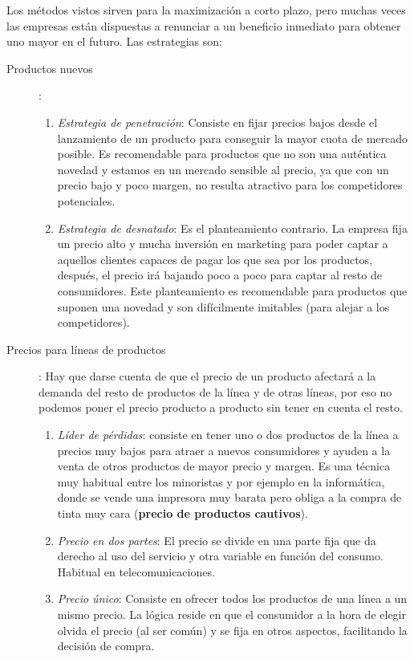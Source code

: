 \documentclass[10pt,a4paper,spanish]{report}
\begin{document}
			Los métodos vistos sirven para la maximización a corto plazo, pero muchas veces las empresas están dispuestas a renunciar a un beneficio inmediato para obtener uno mayor en el futuro. Las estrategias son:
			\begin{description}
				\item[Productos nuevos]: 
				\begin{enumerate}
					\item \textit{\textcolor[rgb]{0.1,0.2,0.4}{Estrategia de penetración}}: Consiste en fijar precios bajos desde el lanzamiento de un producto para conseguir la mayor cuota de mercado posible. Es recomendable para productos que no son una auténtica novedad y estamos en un mercado sensible al precio, ya que con un precio bajo y poco margen, no resulta atractivo para los competidores potenciales.
					\item \textit{\textcolor[rgb]{0.1,0.2,0.4}{Estrategia de desnatado}}: Es el planteamiento contrario. La empresa fija un precio alto y mucha inversión en marketing para poder captar a aquellos clientes capaces de pagar los que sea por los productos, después, el precio irá bajando poco a poco para captar al resto de consumidores. Este planteamiento es recomendable para productos que suponen una novedad y son difícilmente imitables (para alejar a los competidores).
				\end{enumerate}
				\item[Precios para líneas de productos]: Hay que darse cuenta de que el precio de un producto afectará a la demanda del resto de productos de la línea y de otras líneas, por eso no podemos poner el precio producto a producto sin tener en cuenta el resto.
				\begin{enumerate}
					\item \textit{\textcolor[rgb]{0.1,0.2,0.4}{Líder de pérdidas}}: consiste en tener uno o dos productos de la línea a precios muy bajos para atraer a nuevos consumidores y ayuden a la venta de otros productos de mayor precio y margen. Es una técnica muy habitual entre los minoristas y por ejemplo en la informática, donde se vende una impresora muy barata pero obliga a la compra de tinta muy cara (\textbf{precio de productos cautivos}).
					\item \textit{\textcolor[rgb]{0.1,0.2,0.4}{Precio en dos partes}}: El precio se divide en una parte fija que da derecho al uso del servicio y otra variable en función del consumo. Habitual en telecomunicaciones.
					\item \textit{\textcolor[rgb]{0.1,0.2,0.4}{Precio único}}: Consiste en ofrecer todos los productos de una línea a un mismo precio. La lógica reside en que el consumidor a la hora de elegir olvida el precio (al ser común) y se fija en otros aspectos, facilitando la decisión de compra.

\end{enumerate}
\end{description}
\end{document}
